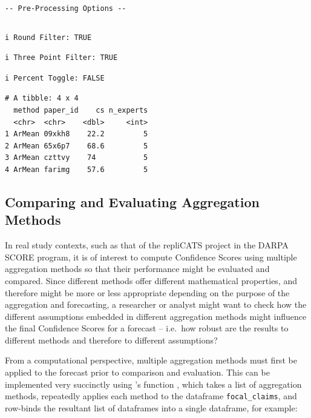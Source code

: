 \documentclass[article]{jss}
\newcommand{\fct}[1]{\code{#1()}}
\begin{document}
\begin{verbatim}
\end{verbatim}

\begin{verbatim}
-- Pre-Processing Options --
\end{verbatim}

\begin{verbatim}
\end{verbatim}

\begin{verbatim}
i Round Filter: TRUE
\end{verbatim}

\begin{verbatim}
i Three Point Filter: TRUE
\end{verbatim}

\begin{verbatim}
i Percent Toggle: FALSE
\end{verbatim}

\begin{verbatim}
# A tibble: 4 x 4
  method paper_id    cs n_experts
  <chr>  <chr>    <dbl>     <int>
1 ArMean 09xkh8    22.2         5
2 ArMean 65x6p7    68.6         5
3 ArMean czttvy    74           5
4 ArMean farimg    57.6         5
\end{verbatim}

\hypertarget{comparing-and-evaluating-aggregation-methods}{%
\subsection{Comparing and Evaluating Aggregation
Methods}\label{comparing-and-evaluating-aggregation-methods}}

In real study contexts, such as that of the repliCATS project in the
DARPA SCORE program, it is of interest to compute Confidence Scores
using multiple aggregation methods so that their performance might be
evaluated and compared. Since different methods offer different
mathematical properties, and therefore might be more or less appropriate
depending on the purpose of the aggregation and forecasting, a
researcher or analyst might want to check how the different assumptions
embedded in different aggregation methods might influence the final
Confidence Scores for a forecast -- i.e.~how robust are the results to
different methods and therefore to different assumptions?

From a computational perspective, multiple aggregation methods must
first be applied to the forecast prior to comparison and evaluation.
This can be implemented very succinctly using 's
\fct{map\_dfr} function \citep{purrr2020} , which takes a list of
aggregation methods, repeatedly applies each method to the dataframe
\texttt{focal\_claims}, and row-binds the resultant list of dataframes
into a single dataframe, for example:
\end{document}
